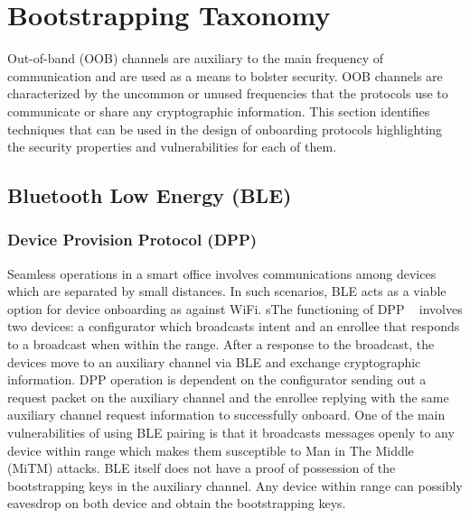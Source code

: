 \section{Bootstrapping Taxonomy}

Out-of-band (OOB) channels are auxiliary to the main frequency of communication and are used as a means to bolster security.
OOB channels are characterized by the uncommon or unused frequencies that the protocols use to communicate or share any cryptographic information.
This section identifies techniques that can be used in the design of onboarding protocols highlighting the security properties and vulnerabilities for each of them. 

\subsection{Bluetooth Low Energy (BLE)}
\subsubsection{Device Provision Protocol (DPP)}
Seamless operations in a smart office involves communications among devices which are separated by small distances.
In such scenarios, BLE acts as a viable option for device onboarding as against WiFi.
sThe functioning of DPP ~\cite{wifialliance} involves two devices: a configurator which broadcasts intent and an enrollee that responds to a broadcast when within the range.
After a response to the broadcast, the devices move to an auxiliary channel via BLE and exchange cryptographic information.
DPP operation is dependent on the configurator sending out a request packet on the auxiliary channel and the enrollee replying with the same auxiliary channel request information to successfully onboard.
One of the main vulnerabilities of using BLE pairing is that it broadcasts messages openly to any device within range which makes them susceptible to Man in The Middle (MiTM) attacks.
BLE itself does not have a proof of possession of the bootstrapping keys in the auxiliary channel.
Any device within range can possibly eavesdrop on both device and obtain the bootstrapping keys.


